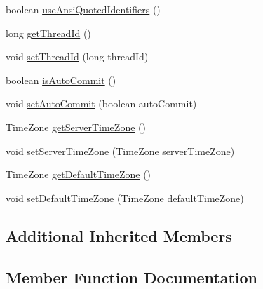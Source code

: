 \begin{DoxyCompactItemize}
boolean \mbox{\hyperlink{classcom_1_1mysql_1_1cj_1_1protocol_1_1x_1_1_x_server_session_aba6be8a1d25c4651ab8098caf4884041}{use\+Ansi\+Quoted\+Identifiers}} ()
\item 
long \mbox{\hyperlink{classcom_1_1mysql_1_1cj_1_1protocol_1_1x_1_1_x_server_session_adade76c5c1984674e31e277d46450123}{get\+Thread\+Id}} ()
\item 
void \mbox{\hyperlink{classcom_1_1mysql_1_1cj_1_1protocol_1_1x_1_1_x_server_session_a0e6d98ffac03ae1adc06d49c67a9ae55}{set\+Thread\+Id}} (long thread\+Id)
\item 
boolean \mbox{\hyperlink{classcom_1_1mysql_1_1cj_1_1protocol_1_1x_1_1_x_server_session_a4c63d47230de3aeed388eb17bb4b6398}{is\+Auto\+Commit}} ()
\item 
void \mbox{\hyperlink{classcom_1_1mysql_1_1cj_1_1protocol_1_1x_1_1_x_server_session_ae79fb491068b57b253b08f214ad06a1c}{set\+Auto\+Commit}} (boolean auto\+Commit)
\item 
Time\+Zone \mbox{\hyperlink{classcom_1_1mysql_1_1cj_1_1protocol_1_1x_1_1_x_server_session_a1cfb3ee1396e5a92fea06afdf6a24944}{get\+Server\+Time\+Zone}} ()
\item 
void \mbox{\hyperlink{classcom_1_1mysql_1_1cj_1_1protocol_1_1x_1_1_x_server_session_af6cfe7212e12090456729683e3ba9bdb}{set\+Server\+Time\+Zone}} (Time\+Zone server\+Time\+Zone)
\item 
Time\+Zone \mbox{\hyperlink{classcom_1_1mysql_1_1cj_1_1protocol_1_1x_1_1_x_server_session_aacde6eddcc1fd40cc726095f2f2d6b44}{get\+Default\+Time\+Zone}} ()
\item 
void \mbox{\hyperlink{classcom_1_1mysql_1_1cj_1_1protocol_1_1x_1_1_x_server_session_a10e130d79476b1e117a213ee9014c877}{set\+Default\+Time\+Zone}} (Time\+Zone default\+Time\+Zone)
\end{DoxyCompactItemize}
\subsection*{Additional Inherited Members}


\subsection{Member Function Documentation}
\mbox{\label{classcom_1_1mysql_1_1cj_1_1protocol_1_1x_1_1_x_server_session_af9937bac8e0266eeea9e7cb23a0b37d0}} 
